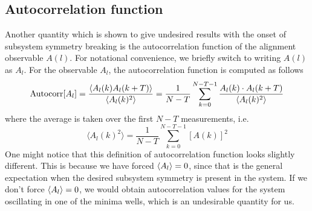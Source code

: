 \documentclass[../thesis_main.tex]{subfiles}
\begin{document}
\subsection{Autocorrelation function}
Another quantity which is shown to give undesired results with the onset of subsystem symmetry breaking is the autocorrelation function of the alignment observable $A(l)$. For notational convenience, we briefly switch to writing $A(l)$ as $A_l$. For the observable $A_l$, the autocorrelation function is computed as follows
\begin{equation}
    \text{Autocorr}[A_l] = \frac{\expval{A_l(k) A_l(k+T)}}{\expval{A_l(k)^2}} = \frac{1}{N-T} \sum_{k=0}^{N-T-1} \frac{A_l(k) \cdot A_l(k+T)}{\expval{A_l(k)^2}}
\end{equation} 
where the average is taken over the first $N-T$ measurements, i.e.
\begin{equation}
    \langle{A_l(k)^2}\rangle = \frac{1}{N-T} \sum_{k=0}^{N-T-1} [A(k)]^2
\end{equation}
One might notice that this definition of autocorrelation function looks slightly different. This is because we have forced $\expval{A_l} = 0$, since that is the general expectation when the desired subsystem symmetry is present in the system. If we don't force $\expval{A_l} = 0$, we would obtain autocorrelation values for the system oscillating in one of the minima wells, which is an undesirable quantity for us.
\end{document}
